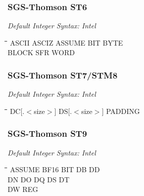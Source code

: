 \subsubsection{SGS-Thomson ST6}

{\em Default Integer Syntax: Intel}

{\tt\begin{tabbing}
\hspace{3cm}\=\hspace{3cm}\=\hspace{3cm}\=\hspace{3cm}\=\kill
ASCII      \> ASCIZ       \> ASSUME      \> BIT  \>  BYTE \\
BLOCK      \> SFR         \> WORD \\
\end{tabbing}}

\subsubsection{SGS-Thomson ST7/STM8}

{\em Default Integer Syntax: Intel}

{\tt\begin{tabbing}
\hspace{3cm}\=\hspace{3cm}\=\hspace{3cm}\=\hspace{3cm}\=\kill
DC[.$<$size$>$] \> DS[.$<$size$>$]   \> PADDING \\
\end{tabbing}}

\subsubsection{SGS-Thomson ST9}

{\em Default Integer Syntax: Intel}

{\tt\begin{tabbing}
\hspace{3cm}\=\hspace{3cm}\=\hspace{3cm}\=\hspace{3cm}\=\kill
ASSUME     \> BF16        \> BIT         \> DB          \> DD \\
DN         \> DO          \> DQ          \> DS          \> DT \\
DW         \> REG \\
\end{tabbing}}

